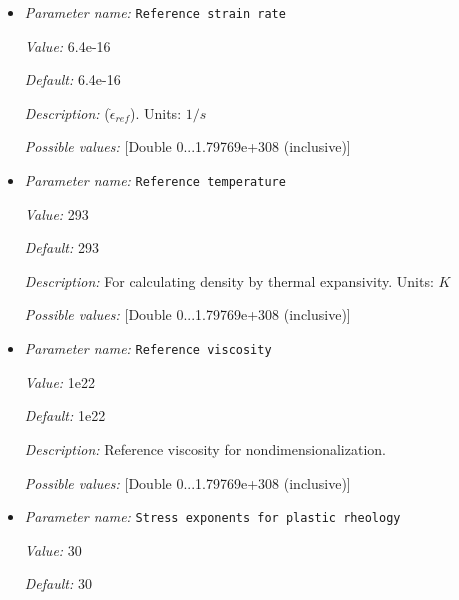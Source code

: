 \begin{itemize}
{\it Default:} 1.24e14


{\it Description:} ($B$). Units: None


{\it Possible values:} [Double 0...1.79769e+308 (inclusive)]
\item {\it Parameter name:} {\tt Reference strain rate}
\label{parameters:Material model/Morency and Doin/Reference strain rate}


{\it Value:} 6.4e-16


{\it Default:} 6.4e-16


{\it Description:} ($\dot{\epsilon}_{ref}$). Units: $1 / s$


{\it Possible values:} [Double 0...1.79769e+308 (inclusive)]
\item {\it Parameter name:} {\tt Reference temperature}
\label{parameters:Material model/Morency and Doin/Reference temperature}


{\it Value:} 293


{\it Default:} 293


{\it Description:} For calculating density by thermal expansivity. Units: $K$


{\it Possible values:} [Double 0...1.79769e+308 (inclusive)]
\item {\it Parameter name:} {\tt Reference viscosity}
\label{parameters:Material model/Morency and Doin/Reference viscosity}


{\it Value:} 1e22


{\it Default:} 1e22


{\it Description:} Reference viscosity for nondimensionalization.


{\it Possible values:} [Double 0...1.79769e+308 (inclusive)]
\item {\it Parameter name:} {\tt Stress exponents for plastic rheology}
\label{parameters:Material model/Morency and Doin/Stress exponents for plastic rheology}


{\it Value:} 30


{\it Default:} 30



\end{itemize}
